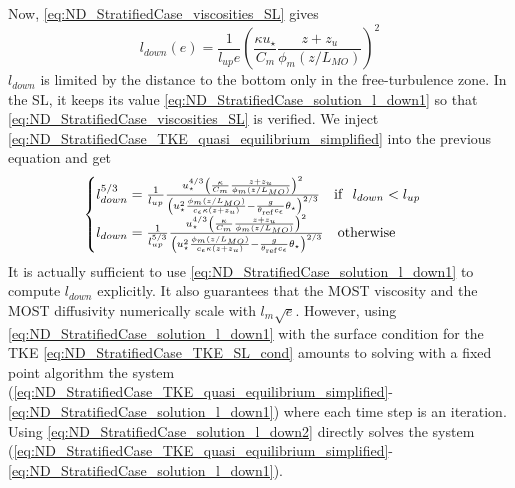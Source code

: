 Now, \eqref{eq:ND_StratifiedCase_viscosities_SL} gives
\begin{equation}
	\label{eq:ND_StratifiedCase_solution_l_down1}
	l_{down}(e) = \frac{1}{l_{up} e} \left(
	\frac{\kappa u_\star}{C_m}
	\frac{z + z_{u}}{\phi_m(z/L_{MO})}
\right)^2
\end{equation}
$l_{down}$ is limited by the distance to the bottom only
in the free-turbulence zone. In the SL, it keeps its value
\eqref{eq:ND_StratifiedCase_solution_l_down1}
so that \eqref{eq:ND_StratifiedCase_viscosities_SL} is
verified.
We inject \eqref{eq:ND_StratifiedCase_TKE_quasi_equilibrium_simplified}
into the previous equation and get
\begin{equation}
	\label{eq:ND_StratifiedCase_solution_l_down2}
	\begin{cases}
	l_{down}^{5/3} = \frac{1}{l_{up}} \frac{u_\star^{4/3}\left(
	\frac{\kappa}{C_m}
	\frac{z + z_{u}}{\phi_m(z/L_{MO})}
	\right)^2}{
	\left({u}_\star^2
	\frac{\phi_m(z/L_{MO})}{c_\epsilon\kappa (z+z_{u})}
	- \frac{g}{\theta_{\rm ref}c_\epsilon}\theta_\star
	\right)^{2/3}} ~~~ {\rm if } ~~l_{down} < l_{up}\\
	l_{down} = \frac{1}{l_{up}^{5/3}} \frac{u_\star^{4/3}\left(
	\frac{\kappa}{C_m}
	\frac{z + z_{u}}{\phi_m(z/L_{MO})}
	\right)^2}{
	\left({u}_\star^2
	\frac{\phi_m(z/L_{MO})}{c_\epsilon\kappa (z+z_{u})}
	- \frac{g}{\theta_{\rm ref}c_\epsilon}\theta_\star
	\right)^{2/3}} ~~~ {\rm otherwise}\\
	\end{cases}
\end{equation}
It is actually sufficient to use
\eqref{eq:ND_StratifiedCase_solution_l_down1}
to compute $l_{down}$ explicitly. It also guarantees that
the MOST viscosity and the MOST diffusivity numerically
scale with $l_m\sqrt{e}$.
However, using \eqref{eq:ND_StratifiedCase_solution_l_down1}
with the surface condition for the TKE
\eqref{eq:ND_StratifiedCase_TKE_SL_cond}
amounts to solving with a fixed point algorithm
the system
(\ref{eq:ND_StratifiedCase_TKE_quasi_equilibrium_simplified}-
\ref{eq:ND_StratifiedCase_solution_l_down1})
where each time step is an iteration.
Using \eqref{eq:ND_StratifiedCase_solution_l_down2}
directly solves the system
(\ref{eq:ND_StratifiedCase_TKE_quasi_equilibrium_simplified}-
\ref{eq:ND_StratifiedCase_solution_l_down1}).
